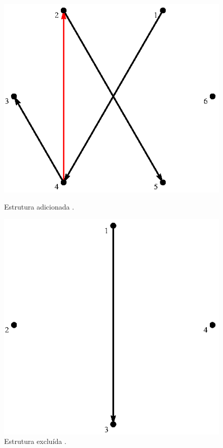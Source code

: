 \documentclass[12pt,a4paper]{article}
\begin{document}
\begin{figure}[htp]
\begin{minipage}[b]{0.5\linewidth}
\centering
\includegraphics[scale=1]{img/addStruct.eps}
\caption[Estrutura adicionada]{Estrutura adicionada .}
\label{fig:addstruct}
\end{minipage}
\hspace{0.5cm}
\begin{minipage}[b]{0.5\linewidth}
\centering
\includegraphics[scale=1]{img/excStruct.eps}
\caption[Estrutura excluída]{Estrutura excluída .}
\label{fig:excstruct}
\end{minipage}
\end{figure}
\end{document}
